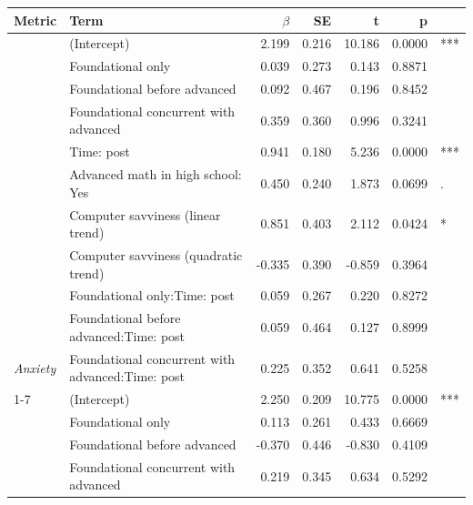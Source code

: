 \begin{table}[!h]
\centering
\begin{threeparttable}
\begin{tabular}[t]{>{}llrrrrl}
\toprule
\textbf{Metric} & \textbf{Term} & \textbf{$\beta$} & \textbf{SE} & \textbf{t} & \textbf{p} & \textbf{}\\
\midrule
 & (Intercept) & 2.199 & 0.216 & 10.186 & 0.0000 & ***\\

 & Foundational only & 0.039 & 0.273 & 0.143 & 0.8871 & \\

 & Foundational before advanced & 0.092 & 0.467 & 0.196 & 0.8452 & \\

 & Foundational concurrent with advanced & 0.359 & 0.360 & 0.996 & 0.3241 & \\

 & Time: post & 0.941 & 0.180 & 5.236 & 0.0000 & ***\\

 & Advanced math in high school: Yes & 0.450 & 0.240 & 1.873 & 0.0699 & .\\

 & Computer savviness (linear trend) & 0.851 & 0.403 & 2.112 & 0.0424 & *\\

 & Computer savviness (quadratic trend) & -0.335 & 0.390 & -0.859 & 0.3964 & \\

 & Foundational only:Time: post & 0.059 & 0.267 & 0.220 & 0.8272 & \\

 & Foundational before advanced:Time: post & 0.059 & 0.464 & 0.127 & 0.8999 & \\

\multirow[t]{-10}{*}[\normalbaselineskip]{\raggedright\arraybackslash \em{Anxiety}} & Foundational concurrent with advanced:Time: post & 0.225 & 0.352 & 0.641 & 0.5258 & \\
\cmidrule{1-7}
 & (Intercept) & 2.250 & 0.209 & 10.775 & 0.0000 & ***\\

 & Foundational only & 0.113 & 0.261 & 0.433 & 0.6669 & \\

 & Foundational before advanced & -0.370 & 0.446 & -0.830 & 0.4109 & \\

 & Foundational concurrent with advanced & 0.219 & 0.345 & 0.634 & 0.5292 & \\


\end{tabular}
\end{threeparttable}
\end{table}
